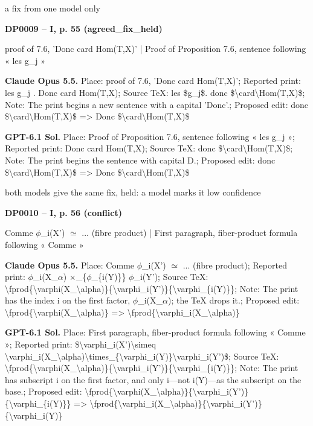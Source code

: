 a fix from one model only\par
\par\noindent\hypertarget{DP0009}{}\textbf{DP0009 -- I, p. 55 (agreed\_fix\_held)}\par
proof of 7.6, 'Donc card Hom(T,X)' | Proof of Proposition 7.6, sentence following « les g\_j »\par
\textbf{Claude Opus 5.5.} Place: proof of 7.6, 'Donc card Hom(T,X)'; Reported print: les g\_j . Donc card Hom(T,X); Source TeX: les \$g\_j\$. donc \$\textbackslash{}card\textbackslash{}Hom(T,X)\$; Note: The print begins a new sentence with a capital 'Donc'.; Proposed edit: donc \$\textbackslash{}card\textbackslash{}Hom(T,X)\$ =\allowbreak > Donc \$\textbackslash{}card\textbackslash{}Hom(T,X)\$\par
\textbf{GPT-6.1 Sol.} Place: Proof of Proposition 7.6, sentence following « les g\_j »; Reported print: Donc card Hom(T,X); Source TeX: donc \$\textbackslash{}card\textbackslash{}Hom(T,X)\$; Note: The print begins the sentence with capital D.; Proposed edit: donc \$\textbackslash{}card\textbackslash{}Hom(T,X)\$ =\allowbreak > Donc \$\textbackslash{}card\textbackslash{}Hom(T,X)\$\par
both models give the same fix, held: a model marks it low confidence\par
\par\noindent\hypertarget{DP0010}{}\textbf{DP0010 -- I, p. 56 (conflict)}\par
Comme \ensuremath{\phi}\_i(X') \ensuremath{\simeq} ... (fibre product) | First paragraph, fiber-product formula following « Comme »\par
\textbf{Claude Opus 5.5.} Place: Comme \ensuremath{\phi}\_i(X') \ensuremath{\simeq} ... (fibre product); Reported print: \ensuremath{\phi}\_i(X\_\ensuremath{\alpha}) \ensuremath{\times}\_\{\ensuremath{\phi}\_\{i(Y)\}\} \ensuremath{\phi}\_i(Y'); Source TeX: \textbackslash{}fprod\{\textbackslash{}varphi(X\_\textbackslash{}alpha)\}\{\textbackslash{}varphi\_i(Y')\}\{\textbackslash{}varphi\_\{i(Y)\}\}; Note: The print has the index i on the first factor, \ensuremath{\phi}\_i(X\_\ensuremath{\alpha}); the TeX drops it.; Proposed edit: \textbackslash{}fprod\{\textbackslash{}varphi(X\_\textbackslash{}alpha)\} =\allowbreak > \textbackslash{}fprod\{\textbackslash{}varphi\_i(X\_\textbackslash{}alpha)\}\par
\textbf{GPT-6.1 Sol.} Place: First paragraph, fiber-product formula following « Comme »; Reported print: \$\textbackslash{}varphi\_i(X')\textbackslash{}simeq \textbackslash{}varphi\_i(X\_\textbackslash{}alpha)\textbackslash{}times\_\{\textbackslash{}varphi\_i(Y)\}\textbackslash{}varphi\_i(Y')\$; Source TeX: \textbackslash{}fprod\{\textbackslash{}varphi(X\_\textbackslash{}alpha)\}\{\textbackslash{}varphi\_i(Y')\}\{\textbackslash{}varphi\_\{i(Y)\}\}; Note: The print has subscript i on the first factor, and only i—not i(Y)—as the subscript on the base.; Proposed edit: \textbackslash{}fprod\{\textbackslash{}varphi(X\_\textbackslash{}alpha)\}\{\textbackslash{}varphi\_i(Y')\}\{\textbackslash{}varphi\_\{i(Y)\}\} =\allowbreak > \textbackslash{}fprod\{\textbackslash{}varphi\_i(X\_\textbackslash{}alpha)\}\{\textbackslash{}varphi\_i(Y')\}\{\textbackslash{}varphi\_i(Y)\}\par
